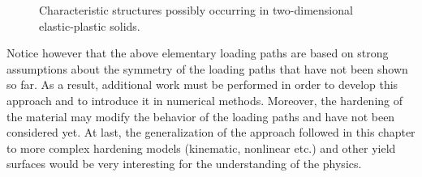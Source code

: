 \begin{figure}[h!]
  \centering
   \qquad 
   \qquad 
  \caption{Characteristic structures possibly occurring in two-dimensional elastic-plastic solids.}
  \label{fig:charac}
\end{figure}
Notice however that the above elementary loading paths are based on strong assumptions about the symmetry of the loading paths that have not been shown so far.
As a result, additional work must be performed in order to develop this approach and to introduce it in numerical methods.
Moreover, the hardening of the material may modify the behavior of the loading paths and have not been considered yet.
At last, the generalization of the approach followed in this chapter to more complex hardening models (kinematic, nonlinear etc.) and other yield surfaces would be very interesting for the understanding of the physics. 


